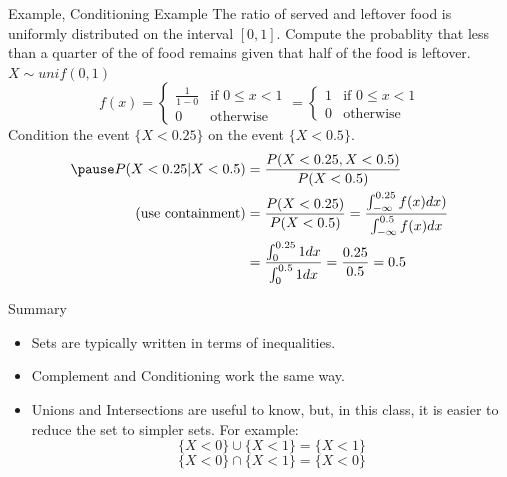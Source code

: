 \documentclass[handout]{beamer}
\newcommand{\nl}[1]{\vspace{#1 em}}
\begin{document}
    \begin{frame}{Example, Conditioning Example}
        The ratio of served and leftover food is uniformly distributed on the interval $[0,1]$. Compute the probablity that less than a quarter of the of food remains given that half of the food is leftover.
        \\ \nl{0.5}
        \pause
        $X\sim unif(0,1)$
        $$ f(x)=
        \begin{cases} \frac{1}{1-0} & \text{if }0\leq x < 1 \\
        0 & \text{otherwise}\end{cases}
        =
        \begin{cases} 1 & \text{if }0\leq x < 1 \\
        0 & \text{otherwise}\end{cases}
         $$
         \pause
        Condition the event $\{ X<0.25 \}$ on the event $\{ X<0.5 \}$.
         \begin{align*}
            \pause P(X<0.25 | X<0.5) &  = \frac{P(X<0.25,X<0.5)}{P(X<0.5)}\\
           \text{(use containment)} & = \frac{P(X<0.25)}{P(X<0.5)} = \frac{\int_{-\infty}^{0.25} f(x) dx)}{\int_{-\infty}^{0.5} f(x) dx}\\
            & = \frac{\int_{0}^{0.25} 1 dx}{\int_{0}^{0.5} 1 dx}  = \frac{0.25}{0.5} = 0.5\\
         \end{align*}
    \end{frame}
    \begin{frame}{Summary}
        \begin{itemize}
            \item Sets are typically written in terms of inequalities.
            \item Complement and Conditioning work the same way.
            \item Unions and Intersections are useful to know, but, in this class, it is easier to reduce the set to simpler sets. For example:
            $$ \{X<0\} \cup \{X<1\} = \{X<1\} $$
            $$ \{X<0\} \cap \{X<1\} = \{X<0\} $$
        \end{itemize}
    \end{frame}
\end{document}

